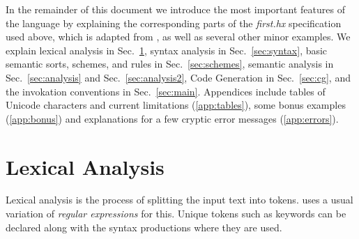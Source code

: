 \documentclass[11pt]{article} %
\begin{document}
\begin{plan}
  In the remainder of this document we introduce the most important features of the \HAX language by
  explaining the corresponding parts of the \emph{first.hx} specification used above, which is
  adapted from \cite[Fig. 1.7]{Aho+:2006}, as well as several other minor examples.  We explain
  lexical analysis in Sec.~\ref{sec:tokens}, syntax analysis in Sec.~\ref{sec:syntax}, basic
  semantic sorts, schemes, and rules in Sec.~\ref{sec:schemes}, semantic analysis in
  Sec.~\ref{sec:analysis} and Sec.~\ref{sec:analysis2}, Code Generation in Sec.~\ref{sec:cg}, and
  the invokation conventions in Sec.~\ref{sec:main}.  Appendices include tables of Unicode
  characters and current limitations (\ref{app:tables}), some bonus examples (\ref{app:bonus}) and
  explanations for a few cryptic error messages (\ref{app:errors}).
\end{plan}


\section{Lexical Analysis}
\label{sec:tokens}

Lexical analysis is the process of splitting the input text into tokens. \HAX uses a usual variation
of \emph{regular expressions} for this.  Unique tokens such as keywords can be declared along with
the syntax productions where they are used.
\end{document}
